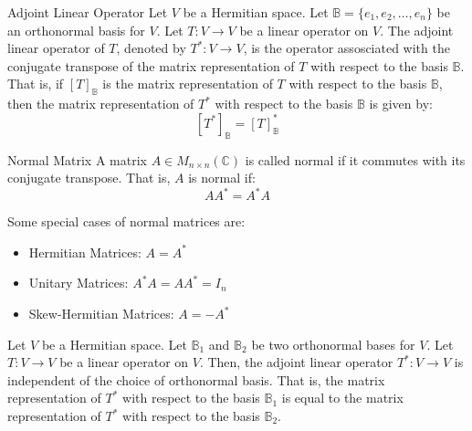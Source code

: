 \documentclass[openany]{book}
\renewcommand{\C}{\mathbb{C}}
\begin{document}
\begin{mydefinition}{Adjoint Linear Operator}
    Let $V$ be a Hermitian space. Let $\mathbb{B} = \{e_1, e_2, \ldots, e_n\}$ be an orthonormal basis for $V$. Let $T: V \to V$ be a linear operator on $V$. The adjoint linear operator of $T$, denoted by $T^*: V \to V$, is the operator assosciated with the conjugate transpose of the matrix representation of $T$ with respect to the basis $\mathbb{B}$. That is, if $[T]_{\mathbb{B}}$ is the matrix representation of $T$ with respect to the basis $\mathbb{B}$, then the matrix representation of $T^*$ with respect to the basis $\mathbb{B}$ is given by:
    $$[T^*]_{\mathbb{B}} = [T]_{\mathbb{B}}^*$$
\end{mydefinition}
\begin{mydefinition}{Normal Matrix}
    A matrix $A \in M_{n\times n}(\C)$ is called normal if it commutes with its conjugate transpose. That is, $A$ is normal if:
    $$A A^* = A^* A$$
\end{mydefinition}
\begin{example}
    Some special cases of normal matrices are:
    \begin{itemize}
        \item Hermitian Matrices: $A = A^*$
        \item Unitary Matrices: $A^* A = AA^* = I_n$
        \item Skew-Hermitian Matrices: $A = -A^*$
    \end{itemize}
\end{example}
\begin{mytheorem}
    Let $V$ be a Hermitian space. Let $\mathbb{B}_1$ and $\mathbb{B}_2$ be two orthonormal bases for $V$. Let $T: V \to V$ be a linear operator on $V$. Then, the adjoint linear operator $T^*: V \to V$ is independent of the choice of orthonormal basis. That is, the matrix representation of $T^*$ with respect to the basis $\mathbb{B}_1$ is equal to the matrix representation of $T^*$ with respect to the basis $\mathbb{B}_2$.
\end{mytheorem}
\end{document}
